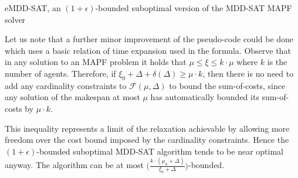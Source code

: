 \documentclass[jair,oneside,11pt]{article}
\begin{document}
\begin{algorithm}[t]
\begin{footnotesize}
\SetAlgoLined {}  \caption{eMDD-SAT, an $(1+\epsilon)$-bounded suboptimal version of the MDD-SAT MAPF solver} \label{alg-eMDD-SAT}
\end{footnotesize}
\end{algorithm}

Let us note that a further minor improvement of the pseudo-code could be done which uses a basic relation of time expansion used in the formula. Observe that in any solution to an MAPF problem it holds that $\mu \leq \xi \leq {k\cdot\mu}$ where $k$ is the number of agents. Therefore, if $\xi_0+\Delta+\delta(\Delta) \geq \mu \cdot k$, then there is no need to add any cardinality constraints to $\mathcal{F}(\mu,\Delta)$ to bound the sum-of-costs, since any solution of the makespan at most $\mu$ has automatically bounded its sum-of-costs by $\mu \cdot k$. 

This inequality represents a limit of the relaxation achievable by allowing more freedom over the cost bound imposed by the cardinality constraints. Hence the $(1+\epsilon)$-bounded suboptimal MDD-SAT algorithm tends to be near optimal anyway. The algorithm can be at most $\big(\frac{k \cdot (\mu_0 + \Delta)}{\xi_0+\Delta}\big)$-bounded.
\end{document}
